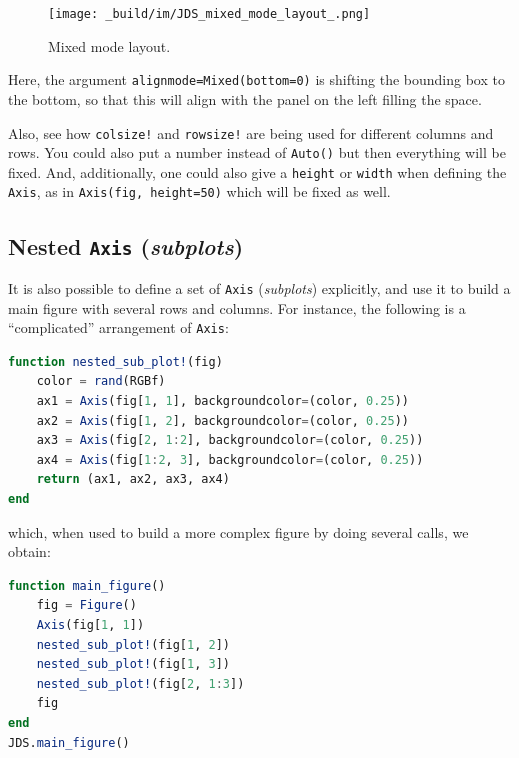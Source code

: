 \documentclass[
  notoc %
]{tufte-book}
\newcommand{\passthrough}[1]{#1}
\begin{document}
\begin{figure}
\hypertarget{fig:mixed_mode_layout}{%
\centering
\texttt{[image: \_build/im/JDS\_mixed\_mode\_layout\_.png]}
\caption{Mixed mode layout.}\label{fig:mixed_mode_layout}
}
\end{figure}

Here, the argument \passthrough{\lstinline!alignmode=Mixed(bottom=0)!}
is shifting the bounding box to the bottom, so that this will align with
the panel on the left filling the space.

Also, see how \passthrough{\lstinline"colsize!"} and
\passthrough{\lstinline"rowsize!"} are being used for different columns
and rows. You could also put a number instead of
\passthrough{\lstinline!Auto()!} but then everything will be fixed. And,
additionally, one could also give a \passthrough{\lstinline!height!} or
\passthrough{\lstinline!width!} when defining the
\passthrough{\lstinline!Axis!}, as in
\passthrough{\lstinline!Axis(fig, height=50)!} which will be fixed as
well.

\hypertarget{nested-axis-subplots}{%
\subsection{\texorpdfstring{Nested \texttt{Axis}
(\emph{subplots})}{Nested Axis (subplots)}}\label{nested-axis-subplots}}

It is also possible to define a set of \passthrough{\lstinline!Axis!}
(\emph{subplots}) explicitly, and use it to build a main figure with
several rows and columns. For instance, the following is a
``complicated'' arrangement of \passthrough{\lstinline!Axis!}:

\begin{lstlisting}[language=Julia]
function nested_sub_plot!(fig)
    color = rand(RGBf)
    ax1 = Axis(fig[1, 1], backgroundcolor=(color, 0.25))
    ax2 = Axis(fig[1, 2], backgroundcolor=(color, 0.25))
    ax3 = Axis(fig[2, 1:2], backgroundcolor=(color, 0.25))
    ax4 = Axis(fig[1:2, 3], backgroundcolor=(color, 0.25))
    return (ax1, ax2, ax3, ax4)
end
\end{lstlisting}

which, when used to build a more complex figure by doing several calls,
we obtain:

\begin{lstlisting}[language=Julia]
function main_figure()
    fig = Figure()
    Axis(fig[1, 1])
    nested_sub_plot!(fig[1, 2])
    nested_sub_plot!(fig[1, 3])
    nested_sub_plot!(fig[2, 1:3])
    fig
end
JDS.main_figure()
\end{lstlisting}
\end{document}
